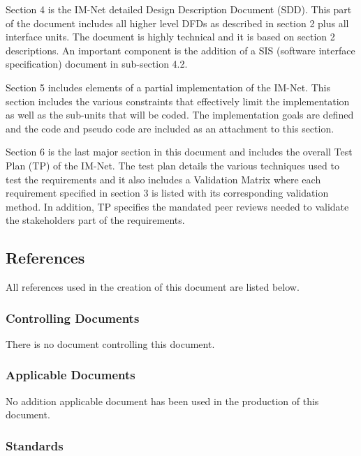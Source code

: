 \documentclass[letterpaper,12pt]{article}
\begin{document}
{Section 4 is the IM-Net detailed Design Description Document (SDD). This part of the document includes all higher level DFDs as described in section 2 plus all interface units. The document is highly technical and it is based on section 2 descriptions. An important component is the addition of a SIS (software interface specification) document in sub-section 4.2.

Section 5 includes elements of a partial implementation of the IM-Net. This section includes the various constraints that effectively limit the implementation as well as the sub-units that will be coded. The implementation goals are defined and the code and pseudo code are included as an attachment to this section.  

Section 6 is the last major section in this document and includes the overall Test Plan (TP) of the IM-Net. The test plan details the various techniques used to test the requirements and it also includes a Validation Matrix where each requirement specified in section 3 is listed with its corresponding validation method. In addition, TP specifies the mandated peer reviews needed to validate the stakeholders part of the requirements.

 
\textcolor{subsection}{\subsection{References}}

All references used in the creation of this document are listed below.

\textcolor{subsubsection}{\subsubsection{Controlling Documents}}

There is no document controlling this document.

\textcolor{subsubsection}{\subsubsection{Applicable Documents}}

No addition applicable document has been used in the production of this document.

\textcolor{subsection}{\subsubsection{Standards}}

}
\end{document}
